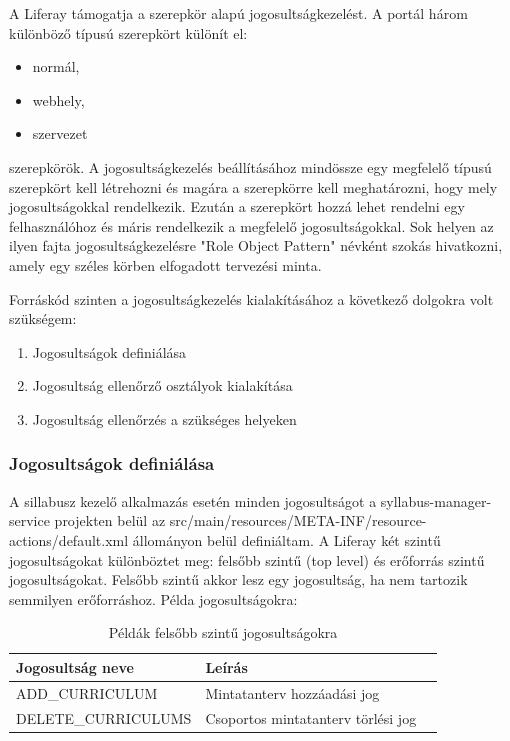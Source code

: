\documentclass[hidelinks, 12pt, a4paper]{report}
\begin{document}
A Liferay támogatja a szerepkör alapú jogosultságkezelést. A portál három különböző típusú szerepkört különít el:
\begin{itemize}
\item normál,
\item webhely,
\item szervezet
\end{itemize}
szerepkörök. A jogosultságkezelés beállításához mindössze egy megfelelő típusú szerepkört kell létrehozni és magára a szerepkörre kell meghatározni, hogy mely jogosultságokkal rendelkezik. Ezután a szerepkört hozzá lehet rendelni egy felhasználóhoz és máris rendelkezik a megfelelő jogosultságokkal. Sok helyen az ilyen fajta jogosultságkezelésre "Role Object Pattern" névként szokás hivatkozni, amely egy széles körben elfogadott tervezési minta.

Forráskód szinten a jogosultságkezelés kialakításához a következő dolgokra volt szükségem:
\begin{enumerate}
\item Jogosultságok definiálása
\item Jogosultság ellenőrző osztályok kialakítása
\item Jogosultság ellenőrzés a szükséges helyeken
\end{enumerate}

\subsubsection{Jogosultságok definiálása}

A sillabusz kezelő alkalmazás esetén minden jogosultságot a syllabus-manager-service projekten belül az src/main/resources/META-INF/resource-actions/default.xml állományon belül definiáltam. A Liferay két szintű jogosultságokat különböztet meg: felsőbb szintű (top level) és erőforrás szintű jogosultságokat. Felsőbb szintű akkor lesz egy jogosultság, ha nem tartozik semmilyen erőforráshoz. Példa jogosultságokra:

\begin{table}[H]
	\caption{Példák felsőbb szintű jogosultságokra}
	\centering
	\begin{tabular}{| l | l | l |}
	\hline
	\textbf{Jogosultság neve} & \textbf{Leírás} \\
	\hline
	ADD\_CURRICULUM & Mintatanterv hozzáadási jog \\
	\hline
	DELETE\_CURRICULUMS & Csoportos mintatanterv törlési jog \\
	\hline
\end{tabular}
\end{table}
\end{document}
